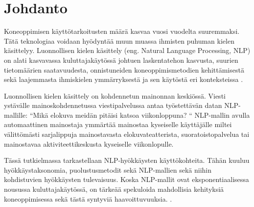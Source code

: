 \chapter{Johdanto\label{intro}}

Koneoppimisen käyttötarkoitusten määrä kasvaa vuosi vuodelta suuremmaksi. Tätä teknologiaa voidaan hyödyntää muun muassa ihmisten puhuman kielen käsittelyy. Luonnollisen kielen käsittely (eng. Natural Language Processing, NLP) on alati kasvavassa kuluttajakäytössä johtuen laskentatehon kasvusta, suurien tietomäärien saatavuudesta, onnistuneiden koneoppimismetodien kehittämisestä sekä laajemmasta ihmiskielen ymmärryksestä ja sen käytöstä eri konteksteissa \citep{doi:10.1126/science.aaa8685}.

Luonnollisen kielen käsittely on kohdennetun mainonnan keskiössä. Viesti ystävälle mainoskohdennetussa viestipalvelussa antaa työstettävän datan NLP-mallille: ``Mikä elokuva meidän pitäisi katsoa viikonloppuna? `` NLP-mallin avulla automaattinen mainostaja ymmärtää mainostaa kyseiselle käyttäjälle miltei välittömästi sarjalippuja mainostavasta elokuvateatterista, suoratoistopalvelua tai mainostavaa aktiviteettikeskusta kyseiselle viikonlopulle.

Tässä tutkielmassa tarkastellaan NLP-hyökkäysten käyttökohteita. Tähän kuuluu hyökkäystaksonomia, puolustusmetodit sekä NLP-mallien sekä niihin kohdistuvien hyökkäysten tulevaisuus. Koska NLP-mallit ovat eksponentiaalisessa nousussa kuluttajakäytössä, on tärkeää spekuloida mahdollisia kehityksiä koneoppimisessa sekä tästä syntyviä haavoittuvuuksia. \citep{yang-etal-2021-rethinking}. \citep{boucher2021bad}